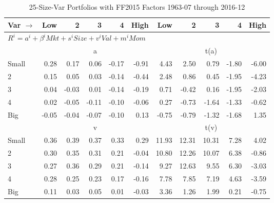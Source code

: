 
\begin{table}[!ht]
\footnotesize
\centering
\caption{25-Size-Var Portfolios with FF2015 Factors 1963-07 through 2016-12}
\begin{tabular}{lrrrrrrrrrr}
  \toprule
    Var $\rightarrow$ & Low & 2 & 3 & 4 & High & Low & 2 & 3 & 4 & High \\ 
  \midrule
  \multicolumn{11}{l}{$R^i=a^i+\beta^iMkt+s^iSize+v^iVal+m^iMom$} \\

  
    
      & \multicolumn{5}{c}{a} & \multicolumn{5}{c}{t(a)}
    
    \\
      \cmidrule(r){2-6} \cmidrule(r){7-11}

    Small   & 0.28  & 0.17  & 0.06  & -0.17  & -0.91  & 4.43  & 2.50  & 0.79  & -1.80  & -6.00  \\
         2  & 0.15  & 0.05  & 0.03  & -0.14  & -0.44  & 2.48  & 0.86  & 0.45  & -1.95  & -4.23  \\
         3  & 0.04  & -0.03  & 0.01  & -0.14  & -0.19  & 0.71  & -0.42  & 0.16  & -1.95  & -2.03  \\
         4  & 0.02  & -0.05  & -0.11  & -0.10  & -0.06  & 0.27  & -0.73  & -1.64  & -1.33  & -0.62  \\
    Big     & -0.05  & -0.04  & -0.07  & -0.10  & 0.13  & -0.75  & -0.79  & -1.32  & -1.68  & 1.35  \\

  
    
      & \multicolumn{5}{c}{v} & \multicolumn{5}{c}{t(v)}
    
    \\
      \cmidrule(r){2-6} \cmidrule(r){7-11}

    Small   & 0.36  & 0.39  & 0.37  & 0.33  & 0.29  & 11.93  & 12.31  & 10.31  & 7.28  & 4.02  \\
         2  & 0.30  & 0.35  & 0.31  & 0.21  & -0.04  & 10.80  & 12.26  & 10.07  & 6.38  & -0.86  \\
         3  & 0.27  & 0.36  & 0.29  & 0.21  & -0.14  & 9.27  & 12.63  & 9.55  & 6.30  & -3.03  \\
         4  & 0.28  & 0.25  & 0.23  & 0.17  & -0.16  & 7.78  & 7.85  & 7.19  & 4.63  & -3.59  \\
    Big     & 0.11  & 0.03  & 0.05  & 0.01  & -0.03  & 3.36  & 1.26  & 1.99  & 0.21  & -0.75  \\

  
    

\end{tabular}
\end{table}
